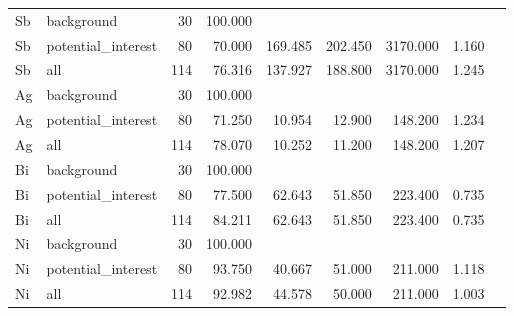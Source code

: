\begin{table}[htbp]
\begin{tabular}{llrrrrrrr}
Sb & background & 30 & 100.000 &  &  &  &  &  \\
Sb & potential\_interest & 80 & 70.000 & 169.485 & 202.450 & 3170.000 & 1.160 &  \\
Sb & all & 114 & 76.316 & 137.927 & 188.800 & 3170.000 & 1.245 &  \\
Ag & background & 30 & 100.000 &  &  &  &  &  \\
Ag & potential\_interest & 80 & 71.250 & 10.954 & 12.900 & 148.200 & 1.234 &  \\
Ag & all & 114 & 78.070 & 10.252 & 11.200 & 148.200 & 1.207 &  \\
Bi & background & 30 & 100.000 &  &  &  &  &  \\
Bi & potential\_interest & 80 & 77.500 & 62.643 & 51.850 & 223.400 & 0.735 &  \\
Bi & all & 114 & 84.211 & 62.643 & 51.850 & 223.400 & 0.735 &  \\
Ni & background & 30 & 100.000 &  &  &  &  &  \\
Ni & potential\_interest & 80 & 93.750 & 40.667 & 51.000 & 211.000 & 1.118 &  \\
Ni & all & 114 & 92.982 & 44.578 & 50.000 & 211.000 & 1.003 &  \\
\bottomrule
\end{tabular}
\end{table}
